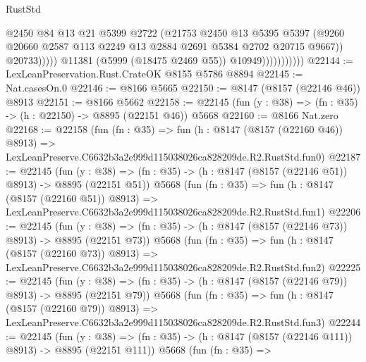 \begin{lexlean}{RustStd}
\begin{coremodule}
                                    @2450
                                    @84
                                    @13
                                    @21
                                    @5399
                                    @2722
                                    (@21753
                                      @2450
                                      @13
                                      @5395
                                      @5397
                                      (@9260
                                        @20660
                                        @2587
                                        @113
                                        @2249
                                        @13
                                        @2884
                                        @2691
                                        @5384
                                        @2702
                                        @20715
                                        @9667))
                                    @20733)))))
                          @11381
                          (@5999 (@18475 @2469 @55))
                          @10949)))))))))))
@22144 := LexLeanPreservation.Rust.CrateOK @8155 @5786 @8894
@22145 := Nat.casesOn.{0}
@22146 := @8166 @5665
@22150 := @8147 (@8157 (@22146 @46)) @8913
@22151 := @8166 @5662
@22158 := @22145 (fun (y : @38) => (fn : @35) -> (h : @22150) -> @8895 (@22151 @46)) @5668
@22160 := @8166 Nat.zero
@22168 := @22158
    (fun (fn : @35) =>
    fun (h : @8147 (@8157 (@22160 @46)) @8913) =>
    LexLeanPreserve.C6632b3a2e999d115038026ca828209de.R2.RustStd.fun0)
@22187 := @22145
    (fun (y : @38) => (fn : @35) -> (h : @8147 (@8157 (@22146 @51)) @8913) -> @8895 (@22151 @51))
    @5668
    (fun (fn : @35) =>
    fun (h : @8147 (@8157 (@22160 @51)) @8913) =>
    LexLeanPreserve.C6632b3a2e999d115038026ca828209de.R2.RustStd.fun1)
@22206 := @22145
    (fun (y : @38) => (fn : @35) -> (h : @8147 (@8157 (@22146 @73)) @8913) -> @8895 (@22151 @73))
    @5668
    (fun (fn : @35) =>
    fun (h : @8147 (@8157 (@22160 @73)) @8913) =>
    LexLeanPreserve.C6632b3a2e999d115038026ca828209de.R2.RustStd.fun2)
@22225 := @22145
    (fun (y : @38) => (fn : @35) -> (h : @8147 (@8157 (@22146 @79)) @8913) -> @8895 (@22151 @79))
    @5668
    (fun (fn : @35) =>
    fun (h : @8147 (@8157 (@22160 @79)) @8913) =>
    LexLeanPreserve.C6632b3a2e999d115038026ca828209de.R2.RustStd.fun3)
@22244 := @22145
    (fun (y : @38) => (fn : @35) -> (h : @8147 (@8157 (@22146 @111)) @8913) -> @8895 (@22151 @111))
    @5668
    (fun (fn : @35) =>

\end{coremodule}
\end{lexlean}

